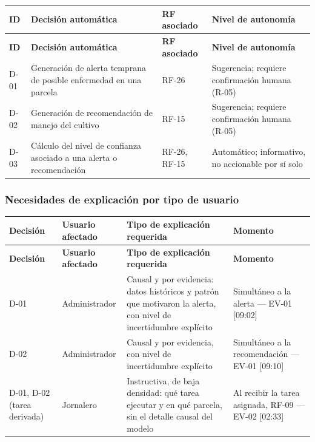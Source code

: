 \documentclass[12pt,a4paper]{article}
\begin{document}
\begin{center}
\begin{longtable}{|p{1.6cm}|p{5.5cm}|p{2.3cm}|p{4.3cm}|}
\hline
\textbf{ID} & \textbf{Decisión automática} & \textbf{RF asociado} & \textbf{Nivel de autonomía} \\
\hline
\endfirsthead
\hline
\textbf{ID} & \textbf{Decisión automática} & \textbf{RF asociado} & \textbf{Nivel de autonomía} \\
\hline
\endhead
\hline
\endfoot
\hline
\endlastfoot
D-01 & Generación de alerta temprana de posible enfermedad en una parcela & RF-26 & Sugerencia; requiere confirmación humana (R-05) \\
\hline
D-02 & Generación de recomendación de manejo del cultivo & RF-15 & Sugerencia; requiere confirmación humana (R-05) \\
\hline
D-03 & Cálculo del nivel de confianza asociado a una alerta o recomendación & RF-26, RF-15 & Automático; informativo, no accionable por sí solo \\
\hline
\end{longtable}
\label{tab:decisiones-ia}
\end{center}

\subsubsection{Necesidades de explicación por tipo de usuario}
\label{sec:necesidades-explicacion}

\begin{center}
\begin{longtable}{|p{2cm}|p{2.3cm}|p{5.3cm}|p{3.6cm}|}
\hline
\textbf{Decisión} & \textbf{Usuario afectado} & \textbf{Tipo de explicación requerida} & \textbf{Momento} \\
\hline
\endfirsthead
\hline
\textbf{Decisión} & \textbf{Usuario afectado} & \textbf{Tipo de explicación requerida} & \textbf{Momento} \\
\hline
\endhead
\hline
\endfoot
\hline
\endlastfoot
D-01 & Administrador & Causal y por evidencia: datos históricos y patrón que motivaron la alerta, con nivel de incertidumbre explícito & Simultáneo a la alerta --- EV-01 [09:02] \\
\hline
D-02 & Administrador & Causal y por evidencia, con nivel de incertidumbre explícito & Simultáneo a la recomendación --- EV-01 [09:10] \\
\hline
D-01, D-02 (tarea derivada) & Jornalero & Instructiva, de baja densidad: qué tarea ejecutar y en qué parcela, sin el detalle causal del modelo & Al recibir la tarea asignada, RF-09 --- EV-02 [02:33] \\
\hline
\end{longtable}
\label{tab:necesidades-explicacion}
\end{center}
\end{document}
